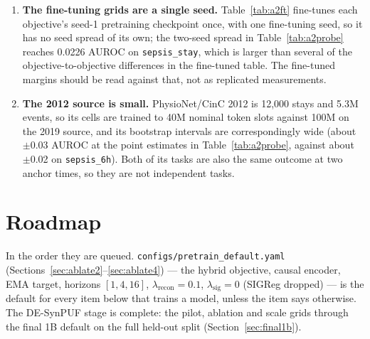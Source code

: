 \documentclass[11pt,a4paper]{article}
\newcommand{\code}[1]{\texttt{\small #1}}
\begin{document}
\begin{enumerate}[leftmargin=*,itemsep=3pt,topsep=3pt]
      RTX 4060), and under fine-tuning no epoch completed in 14 hours. Since
      Clin-JEPA's continuous-target result rests on a pretrained 8B encoder,
      the one difference from this paper's setup that most plausibly accounts
      for it is the one difference this paper could not measure.
\item \textbf{The fine-tuning grids are a single seed.} Table~\ref{tab:a2ft}
      fine-tunes each objective's seed-1 pretraining checkpoint once, with one
      fine-tuning seed, so it has no seed spread of its own; the two-seed
      spread in Table~\ref{tab:a2probe} reaches 0.0226 AUROC on
      \code{sepsis\_stay}, which is larger than several of the
      objective-to-objective differences in the fine-tuned table. The
      fine-tuned margins should be read against that, not as replicated
      measurements.
\item \textbf{The 2012 source is small.} PhysioNet/CinC 2012 is 12{,}000
      stays and 5.3M events, so its cells are trained to 40M nominal token
      slots against 100M on the 2019 source, and its bootstrap intervals are
      correspondingly wide (about $\pm$0.03 AUROC at the point estimates in
      Table~\ref{tab:a2probe}, against about $\pm$0.02 on
      \code{sepsis\_6h}). Both of its tasks are also the same outcome at two
      anchor times, so they are not independent tasks.
\end{enumerate}

\section{Roadmap}
\label{sec:roadmap}

In the order they are queued. \code{configs/pretrain\_default.yaml}
(Sections~\ref{sec:ablate2}--\ref{sec:ablate4}) --- the hybrid objective,
causal encoder, EMA target, horizons $[1, 4, 16]$,
$\lambda_{\mathrm{recon}} = 0.1$, $\lambda_{\mathrm{sig}} = 0$ (SIGReg
dropped) --- is the default for every item below that trains a model, unless
the item says otherwise. The DE-SynPUF stage is complete: the pilot,
ablation and scale grids through the final 1B default on the full held-out
split (Section~\ref{sec:final1b}).
\end{document}
